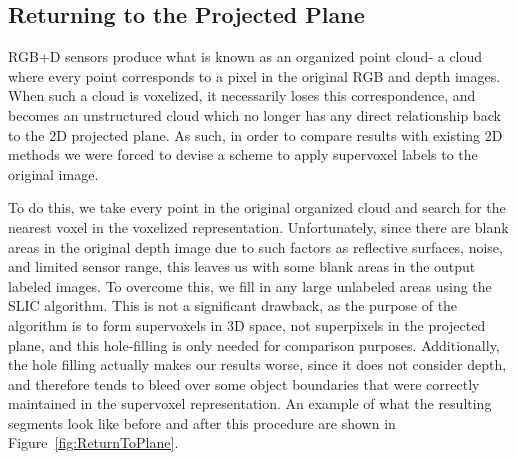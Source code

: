 \subsection{Returning to the Projected Plane}
RGB+D sensors produce what is known as an organized point cloud- a cloud where every point corresponds to a pixel in the original RGB and depth images. When such a cloud is voxelized, it necessarily loses this correspondence, and becomes an unstructured cloud which no longer has any direct relationship back to the 2D projected plane. As such, in order to compare results with existing 2D methods we were forced to devise a scheme to apply supervoxel labels to the original image. 

To do this, we take every point in the original organized cloud and search for the nearest voxel in the voxelized representation. Unfortunately, since there are blank areas in the original depth image due to such factors as reflective surfaces, noise, and limited sensor range, this leaves us with some blank areas in the output labeled images. To overcome this, we fill in any large unlabeled areas using the SLIC algorithm. This is not a significant drawback, as the purpose of the algorithm is to form supervoxels in 3D space, not superpixels in the projected plane, and this hole-filling is only needed for comparison purposes. Additionally, the hole filling actually makes our results worse, since it does not consider depth, and therefore tends to bleed over some object boundaries that were correctly maintained in the supervoxel representation. An example of what the resulting segments look like before and after this procedure are shown in Figure~\ref{fig:ReturnToPlane}. 

